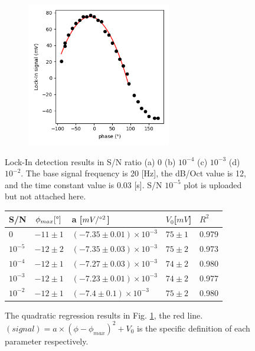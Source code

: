 \documentclass{article}
\begin{document}
\begin{figure}[H]
\hfill
\begin{subfigure}[b]{6.3cm}
  \centering
  \includegraphics[width=6.3cm]{../results/lock_In_phase_plot(Noise10^-2).png}
  \caption{}
\end{subfigure}
\hfill
  \caption{Lock-In detection results in S/N ratio (a) 0 (b) $10^{-4}$ (c) $10^{-3}$ (d) $10^{-2}$.
    The base signal frequency is 20 [Hz], the dB/Oct value is 12, and the time constant value is 0.03 [s].
    S/N $10^{-5}$ plot is uploaded but not attached here.
   }
  \label{fig: lock_in_phase_plot}
\end{figure}

\begin{figure}[H]
  \centering
  \begin{tabular}{  m{1.5cm} | m{2cm} | m{5cm} | m{3cm} | m{1cm}  } 

    S/N & $\phi_{max} [\degree]$ & a [$mV/\degree^2$]& $V_0$[$mV$] & $R^2$\\ \hline
      0 & $-11 \pm 1$  & $(-7.35 \pm 0.01)\times 10^{-3}$ & $75 \pm 1$ & 0.979 \\ \hline
      $10^{-5}$ & $-12 \pm 2$& $(-7.35 \pm 0.03) \times 10^{-3}$ & $75 \pm 2$ & 0.973\\ \hline
      $10^{-4}$ & $-12 \pm 1$& $(-7.27 \pm 0.03) \times 10^{-3}$ & $74 \pm 2 $& 0.980 \\ \hline
      $10^{-3}$ & $-12 \pm 1$ & $(-7.23 \pm 0.01) \times 10^{-3} $& $74 \pm 2$ & 0.977 \\ \hline
      $10^{-2}$ & $-12 \pm 1$ & $(-7.4 \pm 0.1) \times 10^{-3}$ & $75 \pm 2$ & 0.980 \\ 
    
  \end{tabular}
  \caption{
    The quadratic regression results in Fig. \ref{fig: lock_in_phase_plot}, the red line.
    $(signal) = a \times (\phi - \phi_{max})^2  + V_0$ is the specific definition of each parameter respectively.
  }
  \label{fig: lock_in_phase_statics}
\end{figure}
\end{document}
